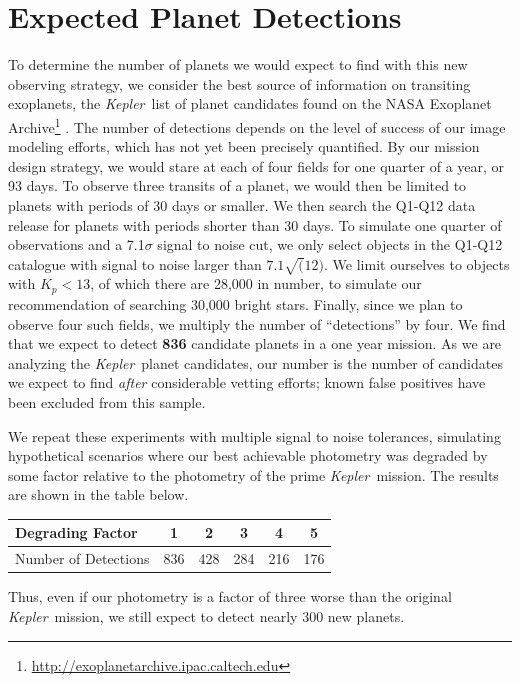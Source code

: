 \documentclass[12pt, preprint]{aastex}
\newcommand{\observatory}[1]{\textsl{#1}}
\newcommand{\kepler}{\observatory{Kepler}}
\newcommand{\Kepler}{\kepler}
\begin{document}
 



\section{Expected Planet Detections}
\label{Haul}
To determine the number of planets we would expect to find with this new 
 observing strategy, we consider the best source of information on transiting 
 exoplanets, the \Kepler\ list of planet candidates found on the NASA 
 Exoplanet Archive\footnote{\url{http://exoplanetarchive.ipac.caltech.edu}}
 \citep{Akeson13}.
The number of detections depends on the level of success of our image modeling
 efforts, which has not yet been precisely quantified. 
By our mission design strategy, we would stare at each of four fields for one 
 quarter of a year, or 93 days. 
To observe three transits of a planet, we would then be limited to planets with 
 periods of 30 days or smaller. 
We then search the Q1-Q12 data release for planets with periods shorter than 
 30 days. 
To simulate one quarter of observations and a 7.1$\sigma$ signal 
 to noise cut, we only select objects in the Q1-Q12 catalogue with signal to 
 noise larger than $7.1\sqrt(12)$. 
We limit ourselves to objects with $K_p < 13$, of which there are 28,000 in 
 number, to simulate our recommendation of searching 30,000 bright stars.
Finally, since we plan to observe four such fields, we multiply the number of 
 ``detections'' by four. 
We find that we expect to detect \textbf{836} candidate planets in a one year
 mission. 
As we are analyzing the \Kepler\ planet candidates, our number is the number 
 of candidates we expect to find \emph{after} considerable vetting efforts; 
 known false positives have been excluded from this sample.

We repeat these experiments with multiple signal to noise tolerances, 
 simulating hypothetical scenarios where our best achievable photometry was 
 degraded by some factor relative to the photometry of the prime \Kepler\ 
 mission. 
The results are shown in the table below.
\begin{center}
\begin{tabular}{|l|c|c|c|c|c|}
    \hline
    Degrading Factor & 1 & 2 & 3 & 4 & 5\\
    \hline
    Number of Detections  & 836 & 428 & 284 & 216 & 176  \\
    \hline
\end{tabular}
\end{center}
Thus, even if our photometry is a factor of three worse than the original 
 \Kepler\ mission, we still expect to detect nearly 300 new planets. 
\end{document}
